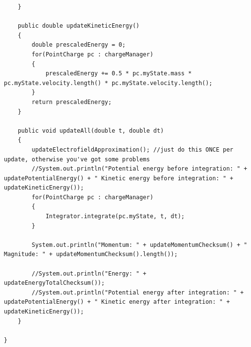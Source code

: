 \documentclass[10pt]{article}
\begin{document}
\begin{verbatim}
	}
	
	public double updateKineticEnergy()
	{
		double prescaledEnergy = 0;
		for(PointCharge pc : chargeManager)
		{
			prescaledEnergy += 0.5 * pc.myState.mass * pc.myState.velocity.length() * pc.myState.velocity.length();
		}
		return prescaledEnergy;
	}
	
	public void updateAll(double t, double dt) 
	{
		updateElectrofieldApproximation(); //just do this ONCE per update, otherwise you've got some problems
		//System.out.println("Potential energy before integration: " + updatePotentialEnergy() + " Kinetic energy before integration: " + updateKineticEnergy());
		for(PointCharge pc : chargeManager)
		{
			Integrator.integrate(pc.myState, t, dt);
		}
		
		System.out.println("Momentum: " + updateMomentumChecksum() + " Magnitude: " + updateMomentumChecksum().length());
		
		//System.out.println("Energy: " + updateEnergyTotalChecksum());
		//System.out.println("Potential energy after integration: " + updatePotentialEnergy() + " Kinetic energy after integration: " + updateKineticEnergy());
	}

}

\end{verbatim}
\end{document}
